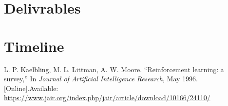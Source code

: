 \documentclass[conference]{IEEEtran}
\begin{document}
	\section{Delivrables}

	\section{Timeline}

	\begin{thebibliography}{00}
		 L. P. Kaelbling, M. L. Littman, A. W. Moore. ``Reinforcement learning: a survey,'' In \textit{Journal of Artificial Intelligence Research}, May 1996.[Online].Available: \url{https://www.jair.org/index.php/jair/article/download/10166/24110/}
	\end{thebibliography}
\end{document}
